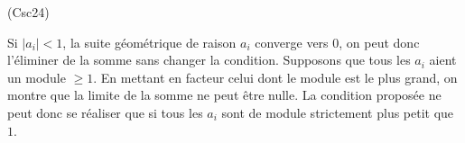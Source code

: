 \begin{tiny}(Csc24)\end{tiny} Si $|a_i|<1$, la suite géométrique de raison $a_i$ converge vers $0$, on peut donc l'éliminer de la somme sans changer la condition.\newline
 Supposons que tous les $a_i$ aient un module $\geq1$. En mettant en facteur celui dont le module est le plus grand, on montre que la limite de la somme ne peut être nulle. La condition proposée ne peut donc se réaliser que si tous les $a_i$ sont de module strictement plus petit que $1$.
